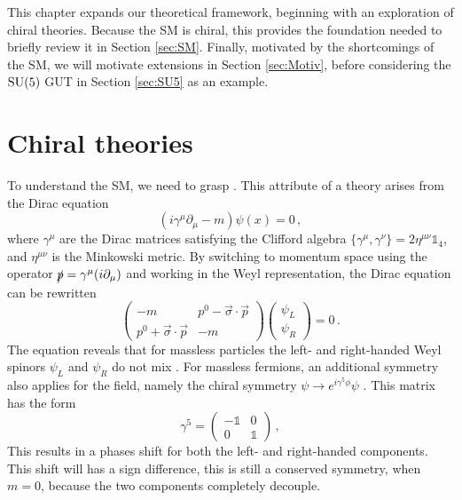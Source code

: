 This chapter expands our theoretical framework, beginning with an exploration of chiral theories. Because the SM is chiral, this provides the foundation needed to briefly review it in Section \ref{sec:SM}. Finally, motivated by the shortcomings of the SM, we will motivate extensions in Section \ref{sec:Motiv}, before considering the $\mathrm{SU}(5)$ GUT in Section \ref{sec:SU5} as an example.
\section{Chiral theories} \label{sec:chiral}
To understand the SM, we need to grasp . This attribute of a theory arises from the Dirac equation 
\begin{equation}
    (i\gamma^\mu \partial_\mu - m)\psi (x) =0\,,
\end{equation}
where $\gamma^\mu$ are the Dirac matrices satisfying the Clifford algebra $\{\gamma^\mu,\gamma^\nu\}=2\eta^{\mu\nu}\mathbb{1}_4$, and $\eta^{\mu\nu}$ is the Minkowski metric. By switching to momentum space using the operator $\slashed{p}=\gamma^\mu(i\partial_\mu)$ and working in the Weyl representation, the Dirac equation can be rewritten 
\begin{equation}
\begin{pmatrix}
-m & p^0 - \vec{\sigma} \cdot \vec{p} \\
p^0 + \vec{\sigma} \cdot \vec{p} & -m
\end{pmatrix}
\begin{pmatrix}
\psi_L \\
\psi_R
\end{pmatrix}
= 0\,.
\end{equation}
The equation reveals that for massless particles the left- and right-handed Weyl spinors $\psi_L$ and $\psi_R$ do not mix \cite{Lancaster:2014}. For massless fermions, an additional symmetry also applies for the field, namely the chiral symmetry $\psi\to e^{i\gamma^5\phi}\psi$ \cite{Zee:2010}. This matrix has the form
\begin{equation}\gamma^5=
\begin{pmatrix}
-\mathbb{1} & 0 \\
0& \mathbb{1}
\end{pmatrix}\,,
\end{equation}
This results in a phases shift for both the left- and right-handed components. This shift will has a sign difference, this is still a conserved symmetry, when $m=0$, because the two components completely decouple.

